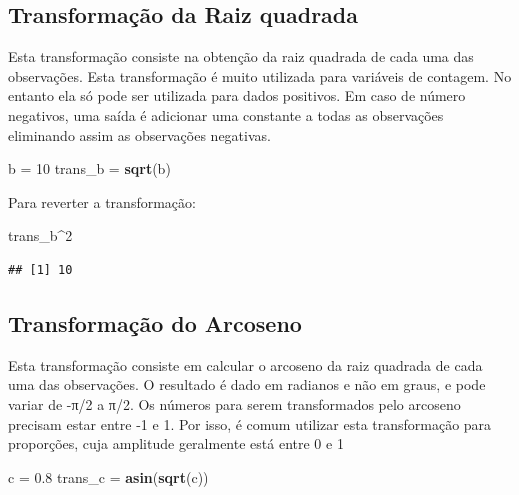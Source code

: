 \documentclass[
]{article}
\newenvironment{Shaded}{\begin{snugshade}}{\end{snugshade}}
\newcommand{\DecValTok}[1]{\textcolor[rgb]{0.00,0.00,0.81}{#1}}
\newcommand{\FloatTok}[1]{\textcolor[rgb]{0.00,0.00,0.81}{#1}}
\newcommand{\KeywordTok}[1]{\textcolor[rgb]{0.13,0.29,0.53}{\textbf{#1}}}
\newcommand{\NormalTok}[1]{#1}
\newcommand{\OperatorTok}[1]{\textcolor[rgb]{0.81,0.36,0.00}{\textbf{#1}}}
\newcommand{\StringTok}[1]{\textcolor[rgb]{0.31,0.60,0.02}{#1}}
\begin{document}
\hypertarget{transformauxe7uxe3o-da-raiz-quadrada}{%
\subsection{Transformação da Raiz quadrada}\label{transformauxe7uxe3o-da-raiz-quadrada}}

Esta transformação consiste na obtenção da raiz quadrada de cada uma das observações. Esta transformação é muito utilizada para variáveis de contagem. No entanto ela só pode ser utilizada para dados positivos. Em caso de número negativos, uma saída é adicionar uma constante a todas as observações eliminando assim as observações negativas.

\begin{Shaded}
\begin{Highlighting}[]
\NormalTok{b =}\StringTok{ }\DecValTok{10}
\NormalTok{trans_b =}\StringTok{ }\KeywordTok{sqrt}\NormalTok{(b)}
\end{Highlighting}
\end{Shaded}

Para reverter a transformação:

\begin{Shaded}
\begin{Highlighting}[]
\NormalTok{trans_b}\OperatorTok{^}\DecValTok{2}
\end{Highlighting}
\end{Shaded}

\begin{verbatim}
## [1] 10
\end{verbatim}

\hypertarget{transformauxe7uxe3o-do-arcoseno}{%
\subsection{Transformação do Arcoseno}\label{transformauxe7uxe3o-do-arcoseno}}

Esta transformação consiste em calcular o arcoseno da raiz quadrada de cada uma das observações. O resultado é dado em radianos e não em graus, e pode variar de -π/2 a π/2. Os números para serem transformados pelo arcoseno precisam estar entre -1 e 1. Por isso, é comum utilizar esta transformação para proporções, cuja amplitude geralmente está entre 0 e 1

\begin{Shaded}
\begin{Highlighting}[]
\NormalTok{c =}\StringTok{ }\FloatTok{0.8}
\NormalTok{trans_c =}\StringTok{ }\KeywordTok{asin}\NormalTok{(}\KeywordTok{sqrt}\NormalTok{(c))}
\end{Highlighting}
\end{Shaded}
\end{document}
